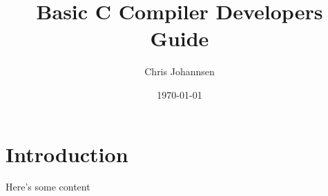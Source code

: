 \documentclass{article}
\title{Basic C Compiler Developers Guide}
\author{Chris Johannsen}
\date{\today}
\begin{document}
\maketitle

\section{Introduction}

Here's some content
\end{document}

